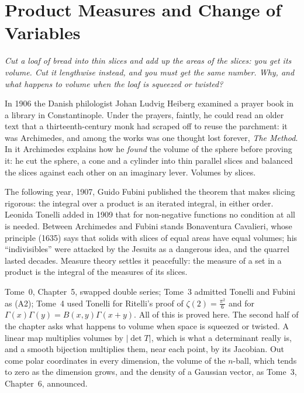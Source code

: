 \chapter{Product Measures and Change of Variables}

\begin{center}\itshape
Cut a loaf of bread into thin slices and add up the areas of the slices: you get its volume. Cut it lengthwise instead, and you
must get the same number. Why, and what happens to volume when the loaf is squeezed or twisted?
\end{center}

In 1906 the Danish philologist Johan Ludvig Heiberg examined a prayer book in a library in Constantinople. Under the
prayers, faintly, he could read an older text that a thirteenth-century monk had scraped off to reuse the parchment: it was
Archimedes, and among the works was one thought lost forever, \emph{The Method}. In it Archimedes explains how he
\emph{found} the volume of the sphere before proving it: he cut the sphere, a cone and a cylinder into thin parallel slices
and balanced the slices against each other on an imaginary lever. Volumes by slices.

The following year, 1907, Guido Fubini published the theorem that makes slicing rigorous: the integral over a product is
an iterated integral, in either order. Leonida Tonelli added in 1909 that for non-negative functions no condition at all is
needed. Between Archimedes and Fubini stands Bonaventura Cavalieri, whose principle (1635) says that solids with slices of
equal areas have equal volumes; his ``indivisibles'' were attacked by the Jesuits as a dangerous idea, and the quarrel
lasted decades. Measure theory settles it peacefully: the measure of a set in a product is the integral of the measures of
its slices.

Tome~0, Chapter~5, swapped double series; Tome~3 admitted Tonelli and Fubini as (A2); Tome~4 used Tonelli for Ritelli's
proof of $\zeta(2)=\frac{\pi^2}6$ and for $\Gamma(x)\Gamma(y)=B(x,y)\Gamma(x+y)$. All of this is proved here. The second half of
the chapter asks what happens to volume when space is squeezed or twisted. A linear map multiplies volumes by $|\det T|$,
which is what a determinant really is, and a smooth bijection multiplies them, near each point, by its Jacobian. Out come
polar coordinates in every dimension, the volume of the $n$-ball, which tends to zero as the dimension grows, and the density
of a Gaussian vector, as Tome~3, Chapter~6, announced.


